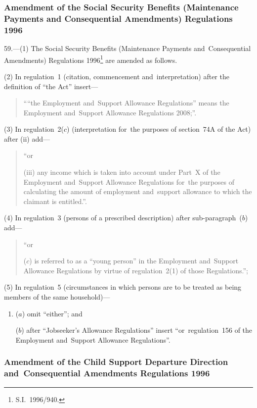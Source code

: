 \documentclass[12pt,a4paper]{article}
\begin{document}
\subsubsection[59. Amendment of the Social Security Benefits (Maintenance Payments and~Consequential Amendments) Regulations 1996]{\sloppy Amendment of the Social Security Benefits (Maintenance Payments and Consequential Amendments) Regulations 1996}

59.---(1)  The Social Security Benefits (Maintenance Payments and~Consequential Amendments) Regulations 1996\footnote{S.I.~1996/940.} are amended as follows.

(2) In regulation~1 (citation, commencement and~interpretation) after the definition of “the Act” insert—
\begin{quotation}
““the Employment and~Support Allowance Regulations” means the Employment and~Support Allowance Regulations 2008;”.
\end{quotation}

(3) In regulation~2($c$)  (interpretation for~the purposes of section~74A of the Act) after (ii)  add—
\begin{quotation}
“or

(iii) any income which is taken into account under Part~X of the Employment and~Support Allowance Regulations for~the purposes of calculating the amount of employment and~support allowance to which the claimant is entitled.”.
\end{quotation}

(4) In regulation~3 (persons of a prescribed description) after sub-\hspace{0pt}paragraph~($b$)  add—
\begin{quotation}
“or

($c$) is referred to as a “young person” in the Employment and~Support Allowance Regulations by virtue of regulation~2(1) of those Regulations.”;
\end{quotation}

(5) In regulation~5 (circumstances in which persons are to be treated as being members of the same household)—
\begin{enumerate}\item[]
($a$) omit “either”; and

($b$) after “Jobseeker’s Allowance Regulations” insert “or~regulation~156 of the Employment and~Support Allowance Regulations”.
\end{enumerate}

\subsubsection[60. Amendment of the Child Support Departure Direction and~Consequential Amendments Regulations 1996]{Amendment of the Child Support Departure Direction and~Consequential Amendments Regulations 1996}
\end{document}
